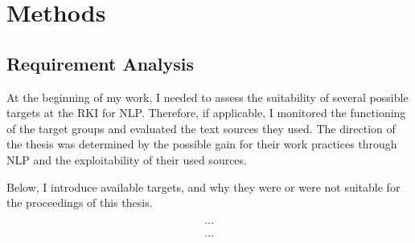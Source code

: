 \chapter{Methods}

\section{Requirement Analysis}
  At the beginning of my work, I needed to assess the suitability of several possible targets at the RKI for NLP.
  Therefore, if applicable, I monitored the functioning of the target groups and evaluated the text sources they used.
  The direction of the thesis was determined by the possible gain for their work practices through NLP and the exploitability of their used sources.

  Below, I introduce available targets, and why they were or were not suitable for the proceedings of this thesis.


\[\dots\]

\[\dots\]


